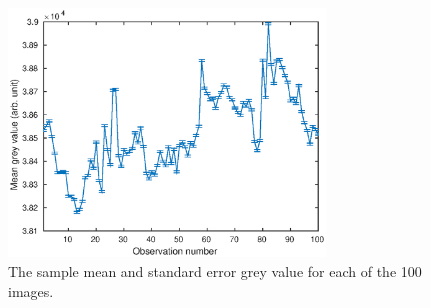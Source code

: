 \documentclass[12pt]{report}
\begin{document}
\begin{figure}[p]
	\centering
	\includegraphics[width=0.75\textwidth]{figures/initial_timeSeries.eps}
	\caption{The sample mean and standard error grey value for each of the 100 images.}
	\label{fig:timeSeries}
\end{figure}
\end{document}
